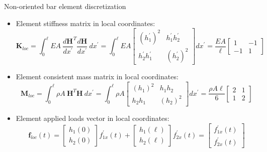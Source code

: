 \documentclass[aspectratio=169]{beamer}
\begin{document}
{  \begin{frame}{Non-oriented bar element discretization}
    \begin{itemize}
      \item Element stiffness matrix in local coordinates:
            \[ \mathbf{K}_{loc} =\int_0^{\ell}  EA\ \frac{d\mathbf{H}}{dx^\prime}^T\frac{d\mathbf{H}}{dx^\prime}\ dx^\prime =\int_0^{\ell}  EA \begin{bmatrix} (h_1^\prime)^2 & h_1^\prime h_2^\prime \\  h_2^\prime h_1^\prime &  (h_2^\prime)^2 \end{bmatrix} dx^\prime =\frac{EA}{\ell} \begin{bmatrix} 1 & -1 \\ -1 & 1 \end{bmatrix} \]
      \item Element consistent mass matrix in local coordinates:
            \[ \mathbf{M}_{loc} =\int_0^{\ell}  \rho A\ \mathbf{H}^T\mathbf{H}\ dx^\prime =\int_0^{\ell}\rho A \begin{bmatrix} (h_1)^2 &h_1 h_2 \\  h_2 h_1 &  (h_2)^2 \end{bmatrix} dx^\prime =\frac{\rho A\ell }{6} \begin{bmatrix} 2 & 1 \\ 1 & 2 \end{bmatrix} \]
      \item Element applied loads vector in local coordinates:
            \[ \mathbf{f}_{loc}(t) =\begin{bmatrix} h_1(0) \\ h_2(0)\end{bmatrix}f_{1x}^\prime(t) + \begin{bmatrix} h_1(\ell) \\ h_2(\ell)\end{bmatrix}f_{2x}^\prime(t) = \begin{bmatrix} f_{1x}^\prime(t) \\ f_{2x}^\prime(t) \end{bmatrix} \]
    \end{itemize}
  \end{frame}

}
\end{document}
